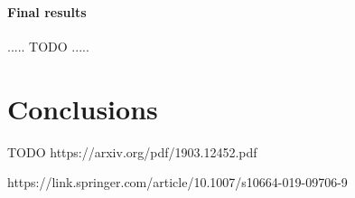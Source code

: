 \documentclass[man, floatsintext, 10pt]{apa6}
\begin{document}
\paragraph{Final results} ..... TODO .....

\section{Conclusions} 

TODO https://arxiv.org/pdf/1903.12452.pdf

https://link.springer.com/article/10.1007/s10664-019-09706-9
\end{document}
